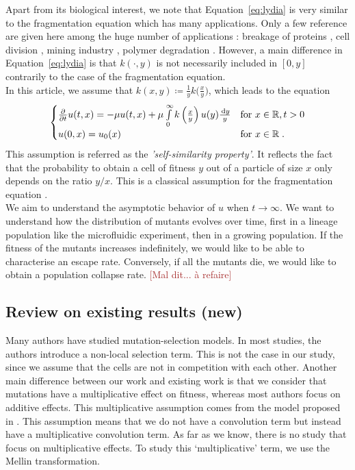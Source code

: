 \documentclass[11pt]{amsart}
\newcommand{\f}{\frac}
\newcommand{\diff}{\,\mathrm{d}}
\newcommand{\ndr}[1]{\textcolor{brown}{[#1]}}
\begin{document}
Apart from its biological interest, we note that Equation~\eqref{eq:lydia} is very similar to the fragmentation equation which has many applications. Only a few reference are given here among the huge number of applications : breakage of proteins \cite{xue2013imaging}, cell division \cite{doumic2013estimating}, mining industry \cite{kolmogorov1941logarithmic, bertoin2005fragmentation}, polymer degradation \cite{montroll1940theory,ziff1985kinetics}. However, a main difference in Equation~\eqref{eq:lydia} is that $k(\cdot, y)$ is not necessarily included in $[0, y]$ contrarily to the case of the fragmentation equation. \\

In this article, we assume that $k(x,y) \coloneqq \f{1}{y}k \big(\frac{x}{y}\big)$, which leads to the equation
\begin{equation}
    \begin{cases}
    \f{\partial}{\partial t} u(t,x) = - \mu u(t,x) + \mu \int\limits_0^\infty k\left(\frac{x}{y}\right) u(y) \f{\diff y}{y} 
    & \text{for } x \in \RR,  t > 0
    \\
    u(0,x) = u_0(x)  & \text{for } x \in \RR \eqfinp
    \label{eq:lydia_selfsimilar}
    \end{cases}
\end{equation}
This assumption is referred as the \textit{'self-similarity property'}. It reflects the fact that the probability to obtain a cell of fitness $y$ out of a particle of size $x$ only depends on the ratio $y/x$. This is a classical assumption for the fragmentation equation \cite{escobedo2005self}. \\
    
We aim to understand the asymptotic behavior of $u$ when $t \to \infty$. We want to understand how the distribution of mutants evolves over time, first in a lineage population like the microfluidic experiment, then in a growing population. If the fitness of the mutants increases indefinitely, we would like to be able to characterise an escape rate. Conversely, if all the mutants die, we would like to obtain a population collapse rate. \ndr{Mal dit... à refaire}
    

\subsection{Review on existing results (new)}
Many authors have studied mutation-selection models. 
In most studies, the authors introduce a non-local selection term. This is not the case in our study, since we assume that the cells are not in competition with each other. 
Another main difference between our work and existing work is that we consider that mutations have a multiplicative effect on fitness, whereas most authors focus on additive effects. This multiplicative assumption comes from the model proposed in \cite{robert2018mutation}. This assumption means that we do not have a convolution term but instead have a multiplicative convolution term. As far as we know, there is no study that focus on multiplicative effects. To study this ‘multiplicative’ term, we use the Mellin transformation. 
\end{document}
